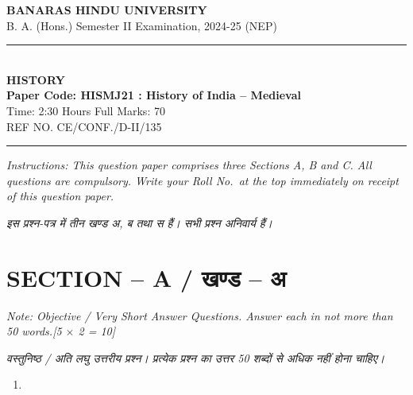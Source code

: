 \documentclass[11pt,a4paper]{article}
\newcommand{\pts}[1]{\hfill \textit{[#1]}}
\begin{document}
\begin{center}
  {\large\bfseries BANARAS HINDU UNIVERSITY}\\[2pt]
  {\normalsize B. A. (Hons.) Semester II Examination, 2024-25 (NEP)}\\[6pt]
  \rule{0.8\linewidth}{0.5pt}\\[6pt]
  {\large\bfseries HISTORY}\\[4pt]
  {\large\bfseries Paper Code: HISMJ21 : History of India -- Medieval}\\[4pt]
  {\normalsize Time: 2:30 Hours \hfill Full Marks: 70}\\[2pt]
  {\small REF NO. CE/CONF./D-II/135}
\end{center}
\rule{\linewidth}{0.4pt}
\smallskip

\noindent \textit{Instructions: This question paper comprises three Sections A, B and C. All questions are compulsory. Write your Roll No.\ at the top immediately on receipt of this question paper.}

\smallskip
\noindent \textit{इस प्रश्न-पत्र में तीन खण्ड अ, ब तथा स हैं। सभी प्रश्न अनिवार्य हैं।}

\bigskip

\section*{SECTION -- A / खण्ड -- अ}
\noindent \textit{Note: Objective / Very Short Answer Questions. Answer each in not more than 50 words.}\pts{5 $\times$ 2 = 10}

\noindent \textit{वस्तुनिष्ठ / अति लघु उत्तरीय प्रश्न। प्रत्येक प्रश्न का उत्तर 50 शब्दों से अधिक नहीं होना चाहिए।}

\begin{enumerate}[label=\textbf{\arabic*.},leftmargin=*,itemsep=8pt]
  \item 
\end{enumerate}
\end{document}
